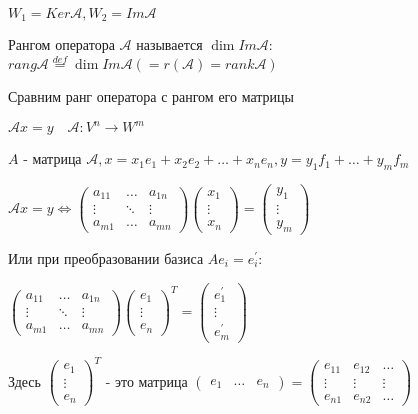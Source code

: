 \documentclass[12pt]{article}
\begin{document}
    $W_1 = Ker \mathcal{A}, W_2 = Im \mathcal{A}$

    \Def Рангом оператора $\mathcal{A}$ называется $\dim Im \mathcal{A}$: $rang \mathcal{A} \stackrel{def}{=} \dim Im \mathcal{A} (= r(\mathcal{A}) = rank \mathcal{A})$

    \Nota Сравним ранг оператора с рангом его матрицы

    $\mathcal{A} x = y \quad \mathcal{A} : V^n \rightarrow W^m$

    $A$ - матрица $\mathcal{A}, x = x_1 e_1 + x_2 e_2 + \dots + x_n e_n, y = y_1 f_1 + \dots + y_m f_m$

    $\mathcal{A}x = y \Longleftrightarrow \begin{pmatrix}
         a_{11} & \dots & a_{1n} \\
         \vdots & \ddots & \vdots \\
         a_{m1} & \dots & a_{mn}
    \end{pmatrix} \begin{pmatrix}
         x_1 \\
         \vdots \\
         x_n
    \end{pmatrix} = \begin{pmatrix}
         y_1 \\
         \vdots \\
         y_m
    \end{pmatrix}$

    Или при преобразовании базиса $Ae_i = e^\prime_i$:

    $\begin{pmatrix}
         a_{11} & \dots & a_{1n} \\
         \vdots & \ddots & \vdots \\
         a_{m1} & \dots & a_{mn}
    \end{pmatrix} \begin{pmatrix}
         e_1 \\
         \vdots \\
         e_n
    \end{pmatrix}^T = \begin{pmatrix}
         e_1^\prime \\
         \vdots \\
         e_m^\prime
    \end{pmatrix}$

    Здесь $\begin{pmatrix}
         e_1 \\
         \vdots \\
         e_n
    \end{pmatrix}^T$ - это матрица $\begin{pmatrix}
         e_1 & \dots & e_n
    \end{pmatrix} = \begin{pmatrix}
         e_{11} & e_{12} & \dots \\
         \vdots & \vdots & \vdots \\
         e_{n1} & e_{n2} & \dots
    \end{pmatrix}$
\end{document}
